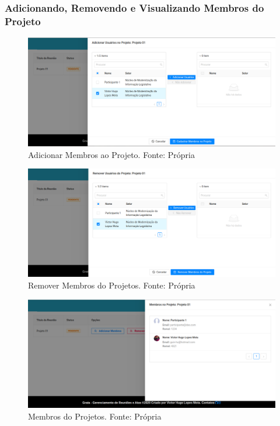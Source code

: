 \subsubsection{Adicionando, Removendo e Visualizando Membros do Projeto}

\begin{figure}[H]
    \centering
    \includegraphics[width=1.0\textwidth]{figuras/adicionando_membros_projeto.png}
    \caption{Adicionar Membros ao Projeto. Fonte: Própria}
    \label{img:adicionar_membros_projeto}
\end{figure}

\begin{figure}[H]
    \centering
    \includegraphics[width=1.0\textwidth]{figuras/remover_usuarios_projeto.png}
    \caption{Remover Membros do Projetos. Fonte: Própria}
    \label{img:remover_membros_projeto}
\end{figure}

\begin{figure}[H]
    \centering
    \includegraphics[width=1.0\textwidth]{figuras/membros_do_projeto.png}
    \caption{Membros do Projetos. Fonte: Própria}
    \label{img:membros_da_reuniao}
\end{figure}

